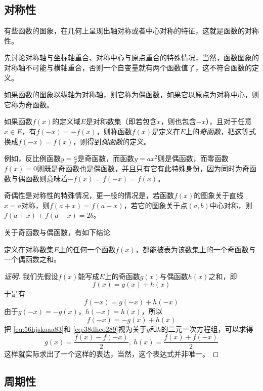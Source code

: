 \subsection{对称性}
\label{sec:symmetric-of-function}

有些函数的图象，在几何上呈现出轴对称或者中心对称的特征，这就是函数的对称性。

先讨论对称轴与坐标轴重合、对称中心与原点重合的特殊情况，当然，函数图象的对称轴不可能与横轴重合，否则一个自变量就有两个函数值了，这不符合函数的定义。

如果函数的图象以纵轴为对称轴，则它称为偶函数，如果它以原点为对称中心，则它称为奇函数。
\begin{definition}
  如果函数$f(x)$的定义域$E$是对称数集（即若包含$x$，则也包含$-x$），且对于任意$x \in E$，有$f(-x)=-f(x)$，则称函数$f(x)$是定义在$E$上的\emph{奇函数}，把这等式换成$f(-x)=f(x)$，则得到\emph{偶函数}的定义。
\end{definition}

例如，反比例函数$y=\frac{a}{x}$是奇函数，而函数$y=ax^2$则是偶函数，而零函数$f(x)=0$则既是奇函数也是偶函数，并且只有它有此特殊身份，因为同时为奇函数与偶函数则意味着$-f(x)=f(-x)=f(x)$。

奇偶性是对称性的特殊情况，更一般的情况是，若函数$f(x)$的图象关于直线$x=a$对称，则$f(a+x)=f(a-x)$，若它的图象关于点$(a,b)$中心对称，则$f(a+x)+f(a-x)=2b$。

关于奇函数与偶函数，有如下结论
\begin{theorem}
  定义在对称数集$E$上的任何一个函数$f(x)$，都能被表为该数集上的一个奇函数与一个偶函数之和。
\end{theorem}

\begin{proof}[证明]
  我们先假设$f(x)$能写成$E$上的奇函数$g(x)$与偶函数$h(x)$之和，即
  \begin{equation}
    \label{eq:56hjskaaa83}
   f(x)=g(x)+h(x) 
  \end{equation}
  于是有
  \[ f(-x)=g(-x)+h(-x) \]
  由于$g(-x)=-g(x)$，$h(-x)=h(x)$，所以
  \begin{equation}
    \label{eq:38dheo289}
   f(-x) = -g(x)+h(x) 
  \end{equation}
  把 \autoref{eq:56hjskaaa83}和 \autoref{eq:38dheo289}视为关于$g$和$h$的二元一次方程组，可以求得
  \[ g(x) = \frac{f(x)-f(-x)}{2}, \  h(x) = \frac{f(x)+f(-x)}{2} \]
  这样就实际求出了一个这样的表达，当然，这个表达式并非唯一。
\end{proof}

\subsection{周期性}
\label{sec:periodicity-of-function}

